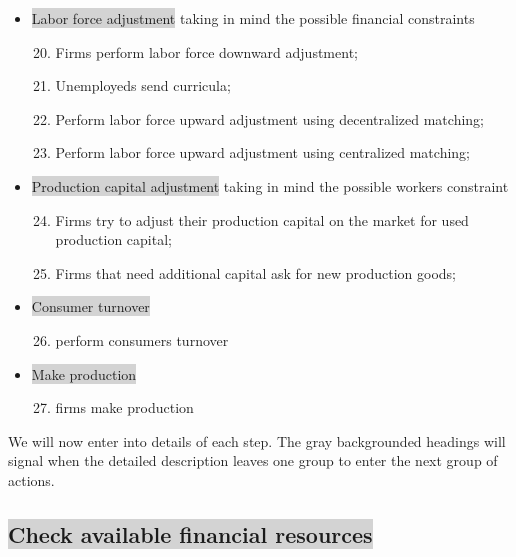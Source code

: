 \documentclass{book}
\begin{document}
\begin{itemize}
	\item \colorbox{lightgray}{Labor force adjustment} taking in mind the possible financial constraints
		\begin{enumerate}
		\setcounter{enumi}{19}
			\item Firms perform labor force downward adjustment;
			\item Unemployeds send curricula;
			\item Perform labor force upward adjustment using decentralized matching; 
			\item Perform labor force upward adjustment using centralized matching; 
		\end{enumerate}
	\item \colorbox{lightgray}{Production capital adjustment} taking in mind the possible workers constraint
		\begin{enumerate}
		\setcounter{enumi}{23}
			\item Firms try to adjust their production capital on the market for used production capital;
			\item Firms that need additional capital ask for new production goods;
		\end{enumerate}
	\item \colorbox{lightgray}{Consumer turnover}
		\begin{enumerate}
		\setcounter{enumi}{25}
			\item perform consumers turnover
		\end{enumerate}
	\item \colorbox{lightgray}{Make production}
		\begin{enumerate}
		\setcounter{enumi}{26}
			\item firms make production
		\end{enumerate}


\end{itemize}

We will now enter into details of each step. The gray backgrounded headings will signal when the detailed description leaves one group to enter the next group of actions.

\subsection*{\colorbox{lightgray}{Check available financial resources}}
\end{document}
